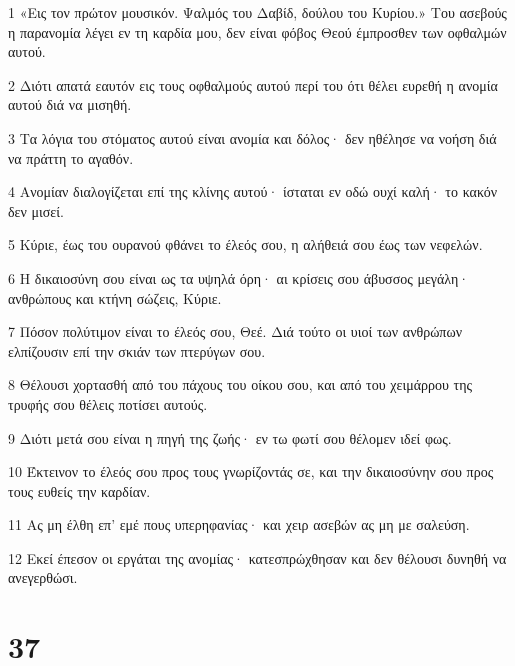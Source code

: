 \par 1 «Εις τον πρώτον μουσικόν. Ψαλμός του Δαβίδ, δούλου του Κυρίου.» Του ασεβούς η παρανομία λέγει εν τη καρδία μου, δεν είναι φόβος Θεού έμπροσθεν των οφθαλμών αυτού.
\par 2 Διότι απατά εαυτόν εις τους οφθαλμούς αυτού περί του ότι θέλει ευρεθή η ανομία αυτού διά να μισηθή.
\par 3 Τα λόγια του στόματος αυτού είναι ανομία και δόλος· δεν ηθέλησε να νοήση διά να πράττη το αγαθόν.
\par 4 Ανομίαν διαλογίζεται επί της κλίνης αυτού· ίσταται εν οδώ ουχί καλή· το κακόν δεν μισεί.
\par 5 Κύριε, έως του ουρανού φθάνει το έλεός σου, η αλήθειά σου έως των νεφελών.
\par 6 Η δικαιοσύνη σου είναι ως τα υψηλά όρη· αι κρίσεις σου άβυσσος μεγάλη· ανθρώπους και κτήνη σώζεις, Κύριε.
\par 7 Πόσον πολύτιμον είναι το έλεός σου, Θεέ. Διά τούτο οι υιοί των ανθρώπων ελπίζουσιν επί την σκιάν των πτερύγων σου.
\par 8 Θέλουσι χορτασθή από του πάχους του οίκου σου, και από του χειμάρρου της τρυφής σου θέλεις ποτίσει αυτούς.
\par 9 Διότι μετά σου είναι η πηγή της ζωής· εν τω φωτί σου θέλομεν ιδεί φως.
\par 10 Έκτεινον το έλεός σου προς τους γνωρίζοντάς σε, και την δικαιοσύνην σου προς τους ευθείς την καρδίαν.
\par 11 Ας μη έλθη επ' εμέ πους υπερηφανίας· και χειρ ασεβών ας μη με σαλεύση.
\par 12 Εκεί έπεσον οι εργάται της ανομίας· κατεσπρώχθησαν και δεν θέλουσι δυνηθή να ανεγερθώσι.

\chapter{37}

